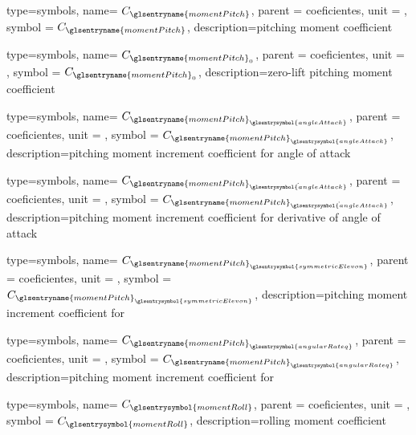 {type=symbols,
    name= \ensuremath{C_{\glsentryname{momentPitch}}},
    parent = {coeficientes},
    unit = \unexpanded{},
    symbol = \ensuremath{C_{\glsentryname{momentPitch}}},
    description={pitching moment coefficient}
}

{type=symbols,
    name= \ensuremath{C_{{\glsentryname{momentPitch}}_{0}}},
    parent = {coeficientes},
    unit = \unexpanded{},
    symbol = \ensuremath{C_{{\glsentryname{momentPitch}}_{0}}},
    description={zero-lift pitching moment coefficient}
}

{type=symbols,
    name= \ensuremath{C_{{\glsentryname{momentPitch}}_{\glsentrysymbol{angleAttack}}}},
    parent = {coeficientes},
    unit = \unexpanded{},
    symbol = \ensuremath{C_{{\glsentryname{momentPitch}}_{\glsentrysymbol{angleAttack}}}},
    description={pitching moment increment coefficient for angle of attack}
}

{type=symbols,
    name= \ensuremath{C_{{\glsentryname{momentPitch}}_{\dot{\glsentrysymbol{angleAttack}}}}},
    parent = {coeficientes},
    unit = \unexpanded{},
    symbol = \ensuremath{C_{{\glsentryname{momentPitch}}_{\dot{\glsentrysymbol{angleAttack}}}}},
    description={pitching moment increment coefficient for derivative of angle of attack}
}

{type=symbols,
    name= \ensuremath{C_{{\glsentryname{momentPitch}}_{\glsentrysymbol{symmetricElevon}}}},
    parent = {coeficientes},
    unit = \unexpanded{},
    symbol = \ensuremath{C_{{\glsentryname{momentPitch}}_{\glsentrysymbol{symmetricElevon}}}},
    description={pitching moment increment coefficient for }
}

{type=symbols,
    name= \ensuremath{C_{{\glsentryname{momentPitch}}_{\glsentrysymbol{angularRateq}}}},
    parent = {coeficientes},
    unit = \unexpanded{},
    symbol = \ensuremath{C_{{\glsentryname{momentPitch}}_{\glsentrysymbol{angularRateq}}}},
    description={pitching moment increment coefficient for }
}

{type=symbols,
    name= \ensuremath{C_{\glsentrysymbol{momentRoll}}},
    parent = {coeficientes},
    unit = \unexpanded{},
    symbol = \ensuremath{C_{\glsentrysymbol{momentRoll}}},
    description={rolling moment coefficient}
}

